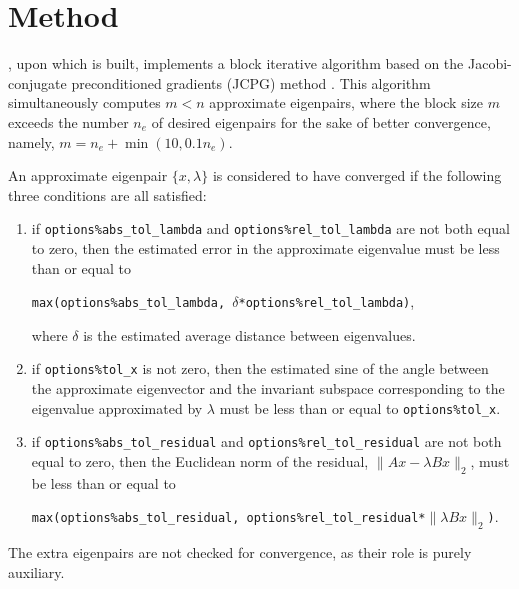 \section{Method}
\label{sec:method}

{\tt \engine}, upon which {\tt\fullpackagename} is built,
implements a block iterative algorithm
based on the Jacobi-conjugate preconditioned gradients (JCPG) method
\cite{jcpg1,jcpg2}.
This algorithm simultaneously computes $m < n$ approximate eigenpairs,
where the block size $m$ exceeds the number $n_e$ of desired eigenpairs
for the sake of better convergence, namely,
$m = n_e + \min(10, 0.1 n_e)$.

An approximate eigenpair 
$\{x,\lambda\}$ is considered to have converged
if %
the following three conditions are all satisfied:
%
\begin{enumerate}
%
\item
if {\tt options\%abs\_tol\_lambda} and 
{\tt options\%rel\_tol\_lambda}
are not both equal to zero, then
the estimated error in the approximate eigenvalue
must be less than or equal to

{\tt max(options\%abs\_tol\_lambda, 
$\delta$*options\%rel\_tol\_lambda)},

where $\delta$ is the estimated average distance
between eigenvalues.
\item
if {\tt options\%tol\_x} is not zero, then
the estimated sine of the angle between
the approximate eigenvector and the invariant subspace
corresponding to the eigenvalue 
approximated by $\lambda$
must be less than or equal to {\tt options\%tol\_x}.
%
\item
if {\tt options\%abs\_tol\_residual} and 
{\tt options\%rel\_tol\_residual}
are not both equal to zero, then
the Euclidean norm of the residual,
$\|A x - \lambda B x\|_2$,
must be less than or equal to

{\tt max(options\%abs\_tol\_residual, 
options\%rel\_tol\_residual*$\|\lambda B x\|_2$)}.
%
\end{enumerate}
%
The extra eigenpairs are not checked for convergence,
as their role is purely auxiliary.


